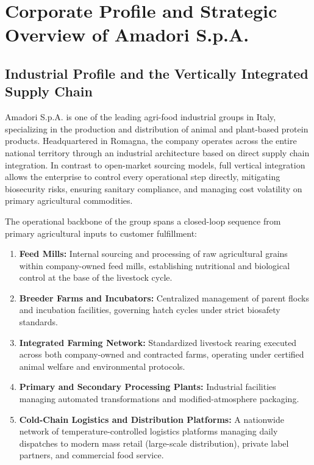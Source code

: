 \chapter{Corporate Profile and Strategic Overview of Amadori S.p.A.}
\label{chap:context}

\section[Industrial Profile]{Industrial Profile and the Vertically Integrated Supply Chain}
\label{sec:industrial_profile}

Amadori S.p.A. is one of the leading agri-food industrial groups in Italy, specializing in the production and distribution of animal and plant-based protein products. 
Headquartered in Romagna, the company operates across the entire national territory through an industrial architecture based on direct supply chain integration. 
In contrast to open-market sourcing models, full vertical integration allows the enterprise to control every operational step directly, mitigating biosecurity risks, 
ensuring sanitary compliance, and managing cost volatility on primary agricultural commodities.

The operational backbone of the group spans a closed-loop sequence from primary agricultural inputs to customer fulfillment:
\begin{enumerate}
    \item \textbf{Feed Mills:} Internal sourcing and processing of raw agricultural grains within company-owned feed mills, 
    establishing nutritional and biological control at the base of the livestock cycle.
    \item \textbf{Breeder Farms and Incubators:} Centralized management of parent flocks and incubation facilities, 
    governing hatch cycles under strict biosafety standards.
    \item \textbf{Integrated Farming Network:} Standardized livestock rearing executed across both company-owned and contracted farms, 
    operating under certified animal welfare and environmental protocols.
    \item \textbf{Primary and Secondary Processing Plants:} Industrial facilities managing automated transformations and modified-atmosphere packaging.
    \item \textbf{Cold-Chain Logistics and Distribution Platforms:} A nationwide network of temperature-controlled logistics platforms managing daily 
    dispatches to modern mass retail (large-scale distribution), private label partners, and commercial food service.
\end{enumerate}

